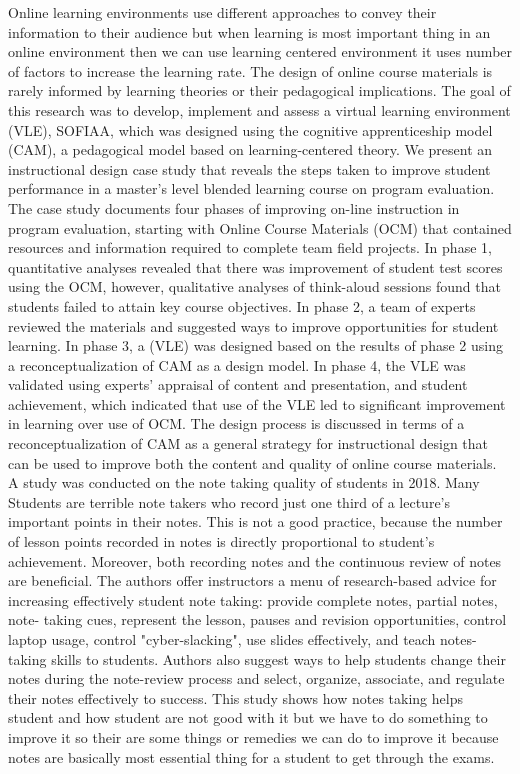 Online learning environments use different approaches to convey their information to their audience but when learning is most important thing in an online environment then we can use learning centered environment it uses number of factors to increase the learning rate. The design of online course materials is rarely informed by learning theories or their pedagogical implications. The goal of this research was to develop, implement and assess a virtual learning environment (VLE), SOFIAA, which was designed using the cognitive apprenticeship model (CAM), a pedagogical model based on learning-centered theory. We present an instructional design case study that reveals the steps taken to improve student performance in a master’s level blended learning course on program evaluation. The case study documents four phases of improving on-line instruction in program evaluation, starting with Online Course Materials (OCM) that contained resources and information required to complete team field projects. In phase 1, quantitative analyses revealed that there was improvement of student test scores using the OCM, however, qualitative analyses of think-aloud sessions found that students failed to attain key course objectives. In phase 2, a team of experts reviewed the materials and suggested ways to improve opportunities for student learning. In phase 3, a (VLE) was designed based on the results of phase 2 using a reconceptualization of CAM as a design model. In phase 4, the VLE was validated using experts’ appraisal of content and presentation, and student achievement, which indicated that use of the VLE led to significant improvement in learning over use of OCM. The design process is discussed in terms of a reconceptualization of CAM as a general strategy for instructional design that can be used to improve both the content and quality of online course materials.\cite{Garcia-Cabrero2018}\\
A study was conducted on the note taking quality of students in 2018. Many Students are terrible note takers who record just one third of a lecture's important points in their notes. This is not a good practice, because the number of lesson points recorded in notes is directly proportional to student's achievement. Moreover, both recording notes and the continuous review of notes are beneficial. The authors offer instructors a menu of research-based advice for increasing effectively student note taking: provide complete notes, partial notes, note- taking cues, represent the lesson, pauses and revision opportunities, control laptop usage, control "cyber-slacking", use slides effectively, and teach notes-taking skills to students. Authors also suggest ways to help students change their notes during the note-review process and select, organize, associate, and regulate their notes effectively to success. This study shows how notes taking helps student and how student are not good with it but we have to do something to improve it so their are some things or remedies we can do to improve it because notes are basically most essential thing for a student to get through the exams.\cite{Kiewra2018}\\
